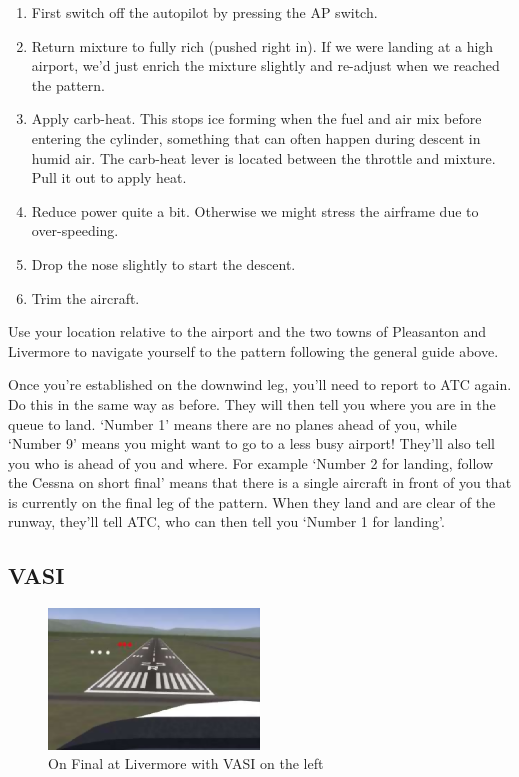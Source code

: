 \begin{enumerate}
\item First switch off the autopilot by pressing the AP switch. 

\item Return mixture to fully rich (pushed right in). If we were landing at a 
high airport, we'd just enrich the mixture slightly and re-adjust when we reached the pattern.

\item Apply carb-heat. This stops ice forming when the fuel and air mix before 
entering the cylinder, something that can often happen during descent in humid air. 
The carb-heat lever is located between the throttle and mixture. Pull it out to apply heat.

\item Reduce power quite a bit. Otherwise we might stress the airframe due to over-speeding.

\item Drop the nose slightly to start the descent.

\item Trim the aircraft.

\end{enumerate}

Use your location relative to the airport and the two towns of Pleasanton and 
Livermore to navigate yourself to the pattern following the general guide above. 

Once you're established on the downwind leg, you'll need to report to ATC again. 
Do this in the same way as before. They will then tell you where you are in the 
queue to land. `Number 1' means there are no planes ahead of you, while 
`Number 9' means you might want to go to a less busy airport! They'll also 
tell you who is ahead of you and where. For example `Number 2 for landing, 
follow the Cessna on short final' means that there is a single aircraft in 
front of you that is currently on the final leg of the pattern. When they land and are
clear of the runway, they'll tell ATC, who can then tell you `Number 1 for landing'.

\subsection{VASI}

\begin{figure}[!htp]
\centering
\includegraphics[width=0.5\textwidth]{vasi2}
\caption{On Final at Livermore with VASI on the left\label{vasi}}
\end{figure}

